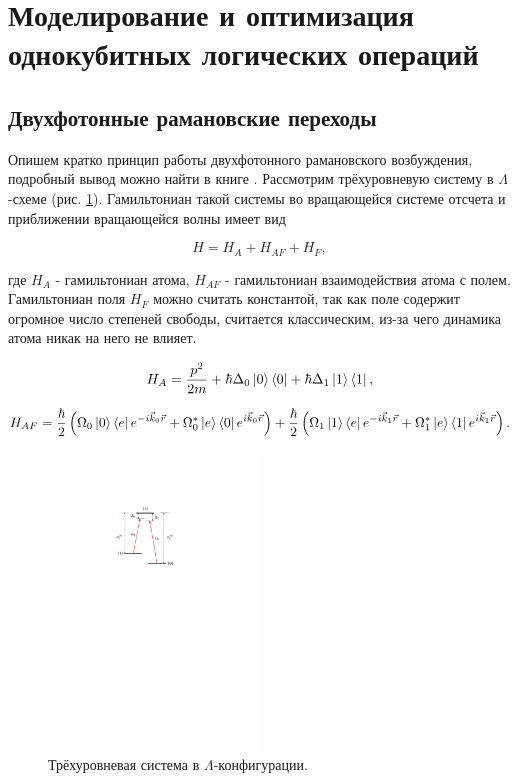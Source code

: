 \section{Моделирование и оптимизация однокубитных логических операций}
\label{sec:chapter_3}

\subsection{Двухфотонные рамановские переходы}

Опишем кратко принцип работы двухфотонного рамановского возбуждения, подробный вывод можно найти в книге \cite{Steck}. Рассмотрим трёхуровневую систему в $\Lambda$-схеме (рис. \ref{fig:raman_scheme}). Гамильтониан такой системы во вращающейся системе отсчета и приближении вращающейся волны имеет вид

\begin{equation}
	H = H_{A} + H_{AF} + H_{F},
\end{equation}

где $H_{A}$ - гамильтониан атома, $H_{AF}$ - гамильтониан взаимодействия атома с полем. Гамильтониан поля $H_{F}$ можно считать константой, так как поле содержит огромное число степеней свободы, считается классическим, из-за чего динамика атома никак на него не влияет. 

\begin{equation}
	H_{A} = \frac{p^2}{2m} + \hbar \Delta_0 \left| 0 \right\rangle\left\langle 0 \right| + \hbar \Delta_{1}\left| 1 \right\rangle\left\langle 1 \right|,
\end{equation}

\begin{equation}
	H_{AF} = \frac{\hbar}{2}\left(\Omega_0\left| 0 \right\rangle\left\langle e \right|e^{-i\vec{k}_0\vec{r}}+\Omega_0^*\left| e \right\rangle\left\langle 0 \right|e^{i\vec{k}_0\vec{r}}\right) + \frac{\hbar }{2}\left(\Omega_1\left| 1 \right\rangle\left\langle e \right|e^{-i\vec{k}_1\vec{r}}+\Omega_1^*\left| e \right\rangle\left\langle 1 \right|e^{i\vec{k}_1\vec{r}} \right).
\end{equation}

\begin{figure}[H]
	\centering
	\includegraphics[width=0.5\textwidth]{images/raman_scheme.pdf}
	\caption{Трёхуровневая система в $\Lambda$-конфигурации.}
	\label{fig:raman_scheme}
\end{figure}

